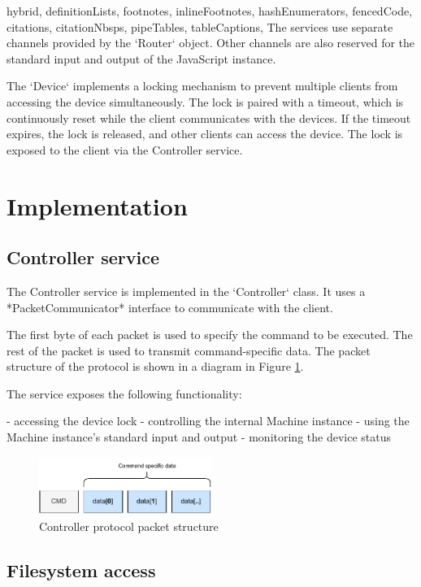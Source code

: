 \begin{markdown*}{%
  hybrid,
  definitionLists,
  footnotes,
  inlineFootnotes,
  hashEnumerators,
  fencedCode,
  citations,
  citationNbsps,
  pipeTables,
  tableCaptions,
}
The services use separate channels provided by the `Router` object. Other channels are also reserved for the standard input and output of the JavaScript instance.

The `Device` implements a locking mechanism to prevent multiple clients from accessing the device simultaneously. The lock is paired with a timeout, which is continuously reset while the client communicates with the devices. If the timeout expires, the lock is released, and other clients can access the device. The lock is exposed to the client via the Controller service.


\section{Implementation}

\subsection{Controller service}

The Controller service is implemented in the `Controller` class. It uses a *PacketCommunicator* interface to communicate with the client.

The first byte of each packet is used to specify the command to be executed. The rest of the packet is used to transmit command-specific data. The packet structure of the protocol is shown in a diagram in Figure \ref{fig:controller-protocol}.

The service exposes the following functionality:

  - accessing the device lock
  - controlling the internal Machine instance
  - using the Machine instance's standard input and output
  - monitoring the device status

\begin{figure}[!ht]
    \centering
    \includegraphics[width=0.5\textwidth]{img/controller-packet}
    \caption{Controller protocol packet structure}
    \label{fig:controller-protocol}
\end{figure}

\subsection{Filesystem access}


\end{markdown*}
